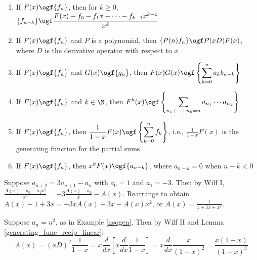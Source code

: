 \documentclass[a4paper]{article}
\begin{document}
\begin{theorem}\label{wilf}
\;
\begin{enumerate}[label=\Roman*.]
\item\label{wilf1} If $F(x)\ogf \{f_n\}$, then for $k\geq0$, $\displaystyle\{f_{n+k}\}\ogf \frac{F(x)-f_0-f_1x-\cdots-f_{k-1}x^{k-1}}{x^k}$
\item\label{wilf2} If $F(x)\ogf \{f_n\}$ and $P$ is a polynomial, then $\{P(n)f_n\}\ogf  P(xD)F(x)$, where $D$ is the derivative operator with respect to $x$
\item\label{wilf3} If $F(x)\ogf \{f_n\}$ and $G(x)\ogf \{g_n\}$, then $\displaystyle F(x)G(x)\ogf \left\{\sum_{k=0}^na_kb_{n-k}\right\}$
\item\label{wilf4} If $F(x)\ogf\{f_n\}$ and $k\in\N$, then $\displaystyle F^k(x)\ogf\left\{\sum_{n_1+\cdots+n_k=n}a_{n_1}\cdots a_{n_k}\right\}$
\item\label{wilf5} If $F(x)\ogf\{f_n\}$, then $\displaystyle\frac1{1-x}F(x)\ogf\left\{\sum_{k=0}^nf_k\right\}$, i.e., $\displaystyle\frac1{1-x}F(x)$ is the generating function for the partial sums
\item\label{wilf6} If $F(x)\ogf\{f_n\}$, then $x^kF(x)\ogf\{a_{n-k}\}$, where $a_{n-k}=0$ when $n-k<0$
\end{enumerate}
\end{theorem}

\begin{example}
Suppose $a_{n+2}=3a_{n+1}-a_n$ with $a_0=1$ and $a_1=-3$. Then by Wilf I, $\frac{A(x)-a_0-a_1x^1}{x^2}=-3\frac{A(x)-a_0}x-A(x)$. Rearrange to obtain $A(x)-1+3x=-3xA(x)+3x-A(x)x^2$, or $A(x)=\frac1{1+3x+x^2}$.
\end{example}

\begin{example}
Suppose $a_n=n^2$, as in Example \ref{nsqgen}. Then by Wilf II and Lemma \ref{generating_func_recip_linear}:
\begin{equation*}
A(x)
=(xD)^2\frac1{1-x}
=x\frac{d}{dx}\left[x\frac d{dx}\frac1{1-x}\right]
=x\frac{d}{dx}\frac x{(1-x)^2}
=\frac{x(1+x)}{(1-x)^3}
\end{equation*}
\end{example}
\end{document}

